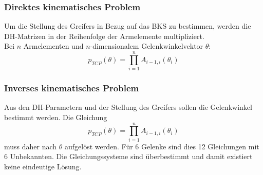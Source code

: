 \subsubsection*{Direktes kinematisches Problem}

Um die Stellung des Greifers in Bezug auf das BKS zu bestimmen, werden die DH-Matrizen in der Reihenfolge der Armelemente multipliziert. \\ Bei $n$ Armelementen und $n$-dimensionalem Gelenkwinkelvektor $\theta$:
$$p_{TCP}(\theta) = \prod\limits_{i=1}^n A_{i-1,i}(\theta_i)$$

\subsubsection*{Inverses kinematisches Problem}

Aus den DH-Parametern und der Stellung des Greifers sollen die Gelenkwinkel bestimmt werden. Die Gleichung
$$p_{TCP}(\theta) = \prod\limits_{i=1}^n A_{i-1,i}(\theta_i)$$
muss daher nach $\theta$ aufgelöst werden. Für 6 Gelenke sind dies 12 Gleichungen mit 6 Unbekannten. Die Gleichungssysteme sind überbestimmt und damit existiert keine eindeutige Lösung.







